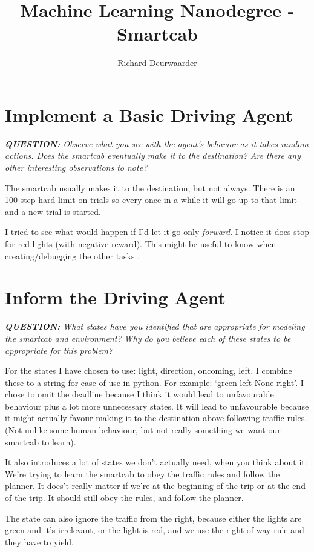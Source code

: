 \documentclass[11pt]{article}
\title{\textbf{Machine Learning Nanodegree - Smartcab}}
\author{Richard Deurwaarder}
\date{}
\begin{document}
\maketitle

\section{Implement a Basic Driving Agent}

\begin{center}
\textit{\textbf{QUESTION:} Observe what you see with the agent's behavior as it takes random actions. Does the smartcab eventually make it to the destination? Are there any other interesting observations to note?}
\end{center}

The smartcab usually makes it to the destination, but not always. There is an 100 step hard-limit on trials so every once in a while it will go up to that limit and a new trial is started.\par
I tried to see what would happen if I'd let it go only 	\textit{forward}. I notice it does stop for red lights (with negative reward). This might be useful to know when creating/debugging the other tasks .

\section{Inform the Driving Agent}
\begin{center}
\textit{\textbf{QUESTION:} What states have you identified that are appropriate for modeling the smartcab and environment? Why do you believe each of these states to be appropriate for this problem?}
\end{center}

For the states I have chosen to use: light, direction, oncoming, left. I combine these to a string for ease of use in python. For example: `green-left-None-right'. I chose to omit the deadline because I think it would lead to unfavourable behaviour plus a lot more unnecessary states. It will lead to unfavourable because it might actually favour making it to the destination above following traffic rules. (Not unlike some human behaviour, but not really something we want our smartcab to learn).\par
It also introduces a lot of states we don't actually need, when you think about it: We're trying to learn the smartcab to obey the traffic rules and follow the planner. It does't really matter if we're at the beginning of the trip or at the end of the trip. It should still obey the rules, and follow the planner.\par
The state can also ignore the traffic from the right, because either the lights are green and it's irrelevant, or the light is red, and we use the right-of-way rule and they have to yield.
\end{document}
